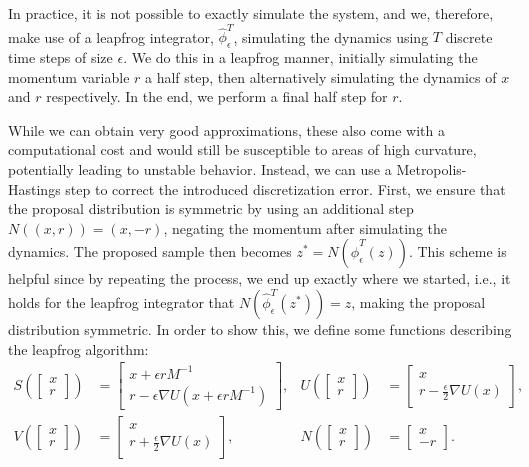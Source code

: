 In practice, it is not possible to exactly simulate the system, and we, therefore, make use of a leapfrog integrator, $\hat{\phi}_\epsilon^T$, simulating the dynamics using $T$ discrete time steps of size $\epsilon$. 
We do this in a leapfrog manner, initially simulating the momentum variable $r$ a half step, then alternatively simulating the dynamics of $x$ and $r$ respectively.
In the end, we perform a final half step for $r$.

While we can obtain very good approximations, these also come with a computational cost and would still be susceptible to areas of high curvature, potentially leading to unstable behavior. 
Instead, we can use a Metropolis-Hastings step to correct the introduced discretization error.
First, we ensure that the proposal distribution is symmetric by using an additional step $N((x, r)) = (x, -r)$, negating the momentum after simulating the dynamics.
The proposed sample then becomes $z^\ast = N(\hat{\phi}_\epsilon^T(z)) $.
This scheme is helpful since by repeating the process, we end up exactly where we started, i.e., it holds for the leapfrog integrator that $N(\hat{\phi}_\epsilon^T(z^\ast)) = z$, making the proposal distribution symmetric.
In order to show this, we define some functions describing the leapfrog algorithm:
\begin{align} 
    S \left(\begin{bmatrix} x \\ r \end{bmatrix}\right) 
    &= \begin{bmatrix} x + \epsilon r M^{-1} \\ r - \epsilon \nabla U(x + \epsilon r M^{-1}) \end{bmatrix}, &
    U\left(\begin{bmatrix} x \\ r \end{bmatrix}\right) 
    &= \begin{bmatrix} x \\ r - \frac{\epsilon}{2} \nabla U(x) \end{bmatrix}, \label{eq:leapfrog-defs:1} \\
    V\left(\begin{bmatrix} x \\ r \end{bmatrix}\right)
    &= \begin{bmatrix} x \\ r + \frac{\epsilon}{2} \nabla U(x) \end{bmatrix}, &
    N \left(\begin{bmatrix} x \\ r \end{bmatrix}\right) 
    &= \begin{bmatrix} x \\ -r \label{eq:leapfrog-defs:2}
    \end{bmatrix}. 
\end{align}
